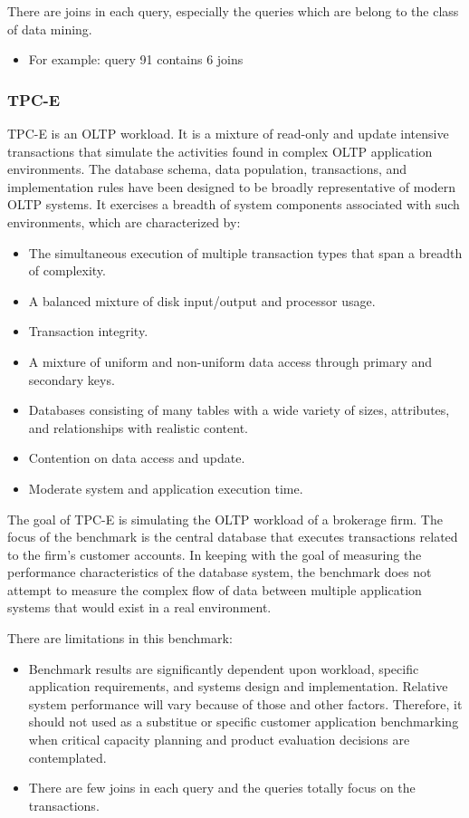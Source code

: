 {\justify
There are joins in each query, especially the queries which are belong to the class of data mining.
\begin{itemize}
\item For example: query 91 contains 6 joins
\end{itemize}
\par }
\subsubsection{TPC-E}
{\justify
TPC-E \cite{TPC} is an OLTP workload. It is a mixture of read-only and update intensive transactions that simulate the activities found in complex OLTP application environments. The database schema, data population, transactions, and implementation rules have been designed to be broadly representative of modern OLTP systems. It exercises a breadth of system components associated with such environments, which are characterized by:
\begin{itemize}
\item The simultaneous execution of multiple transaction types that span a breadth of complexity.
\item A balanced mixture of disk input/output and processor usage.
\item Transaction integrity.
\item A mixture of uniform and non-uniform data access through primary and secondary keys.
\item Databases consisting of many tables with a wide variety of sizes, attributes, and relationships with realistic content.
\item Contention on data access and update.
\item Moderate system and application execution time.
\end{itemize}
\par }
{\justify
The goal of TPC-E is simulating the OLTP workload of a brokerage firm. The focus of the benchmark is the central database that executes transactions related to the firm's customer accounts. In keeping with the goal of measuring the performance characteristics of the database system, the benchmark does not attempt to measure the complex flow of data between multiple application systems that would exist in a real environment.
\par }
\vspace{0.5cm}
{\justify
There are limitations in this benchmark:
\begin{itemize}
\item Benchmark results are significantly dependent upon workload, specific application requirements, and systems design and implementation. Relative system performance will vary because of those and other factors. Therefore, it should not used as a substitue or specific customer application benchmarking when critical capacity planning and product evaluation decisions are contemplated.
\item There are few joins in each query and the queries totally focus on the transactions.
\end{itemize}
\par }
